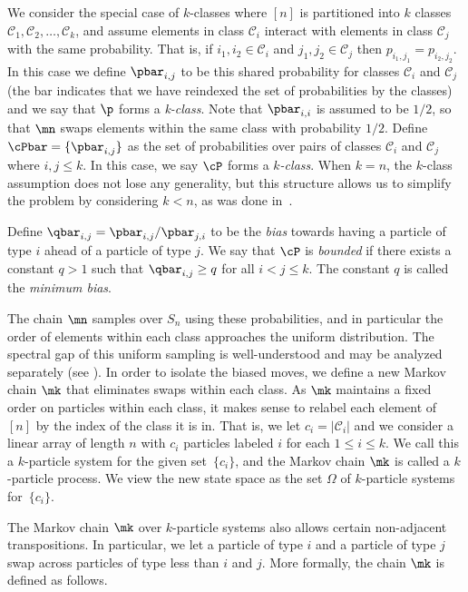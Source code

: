\documentclass{toc}
\begin{document}
We consider the special case of $k$-classes where $[n]$ is partitioned 
into $k$ classes $\mathcal{C}_1,\mathcal{C}_2,\ldots, \mathcal{C}_k$, 
and assume elements in class $\mathcal{C}_i$ interact with elements in 
class $\mathcal{C}_j$ with the same probability.  That is, if 
$i_1,i_2\in \mathcal{C}_i$ and $j_1,j_2\in \mathcal{C}_j$ then 
$p_{i_1,j_1} = p_{i_2,j_2}$.  In this case we define $\pbar_{i,j}$ to 
be this shared probability for classes $\mathcal{C}_i$ and 
$\mathcal{C}_j$ (the bar indicates that we have reindexed the set of 
probabilities by the classes) and we say that $\p$ forms a 
\emph{k-class}.  Note that $\pbar_{i,i}$ is assumed to be $1/2$, so 
that $\mn$ swaps elements within the same class with probability $1/2$.  
Define $\cPbar=\{\pbar_{i,j}\}$ as the set of probabilities over pairs 
of classes $\mathcal{C}_i$ and $\mathcal{C}_j$ where $i,j\leq k$.  In 
this case, we say $\cP$ forms a \emph{$k$-class}.  When $k=n$, the 
$k$-class assumption does not lose any generality, but this structure 
allows us to simplify the problem by considering $k<n$, as was done 
in~\cite{MS,HW16}. 

Define $\qbar_{i,j} =  \pbar_{i,j}/\pbar_{j,i}$ to be the \emph{bias} 
towards having a particle of type $i$ ahead of a particle of type $j$.  
We say that $\cP$ is \emph{bounded} if there exists a constant $q>1$ 
such that $\qbar_{i,j}\geq q$ for all $i<j\leq k$.  The constant $q$ is 
called the \emph{minimum bias}. 

The chain $\mn$ samples over $S_n$ using these probabilities, and in 
particular the order of elements within each class approaches the 
uniform distribution.  The spectral gap of this uniform sampling is 
well-understood and may be analyzed separately (see 
).  In order to isolate the biased moves, we define 
a new Markov chain $\mk$ that eliminates swaps within each class.  As 
$\mk$ maintains a fixed order on particles within each class, it makes 
sense to relabel each element of $[n]$ by the index of the class it is 
in.  That is, we let $c_i = |\mathcal{C}_i|$ and we consider a linear 
array of length $n$ with $c_i$ particles labeled $i$ for each $1\leq 
i\leq k$.  We call this a $k$-particle system for the given 
set~$\{c_i\}$, and the Markov chain $\mk$ is called a $k$-particle 
process.  We view the new state space as the set $\Omega$ of 
$k$-particle systems for~$\{c_i\}$.


The Markov chain $\mk$ over $k$-particle systems also allows certain 
non-adjacent transpositions.  In particular, we let a particle of type 
$i$ and a particle of type $j$ swap across particles of type less than 
$i$ and $j$.  More formally, the chain $\mk$ is defined as follows.
\end{document}
